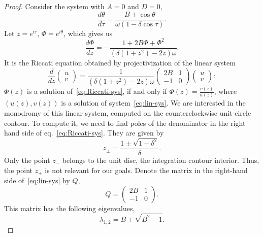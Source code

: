 \documentclass[preprint,12pt]{elsarticle}
\theoremstyle{plain}
\numberwithin{equation}{section}
\numberwithin{equation}{section}
\begin{document}
\begin{proof}

Consider the system with $A=0$ and $D=0$,
\begin{equation}\label{eq:zero-AD-tor-sys}
    \frac{d\theta}{d\tau} = \frac{B+\cos\theta}{\omega(1-\delta\cos\tau)}.
\end{equation}
Let $z=e^{i\tau}$, $\Phi=e^{i\theta}$, which gives us
\begin{equation}\label{eq:Riccati-sys}
    \frac{d\Phi}{dz}=-\frac{1+2B\Phi+\Phi^2}{(\delta(1+z^2)-2z)\omega}.
\end{equation}
It is the Riccati equation obtained by  projectivization of the linear system 
\begin{equation}\label{eq:lin-sys}
    \frac{d}{dz}
    \begin{pmatrix}
        u \\ v
    \end{pmatrix}=
    \frac{1}{(\delta(1+z^2)-2z)\omega}
    \begin{pmatrix}
        2B & 1 \\ -1 & 0
    \end{pmatrix}
    \begin{pmatrix}
        u \\ v
    \end{pmatrix}:
\end{equation}
$\Phi(z)$ is a solution of~\eqref{eq:Riccati-sys}, if and only if $\Phi(z)=\frac{v(z)}{u(z)}$, where $(u(z),v(z))$ is a solution of system~\eqref{eq:lin-sys}. 
We are interested in the monodromy of this linear system, computed on the counterclockwise unit circle contour. To compute it, we need to find poles of the denominator in the right hand side of eq.~\eqref{eq:Riccati-sys}. They are given by
\begin{equation}
    z_{\pm} = \frac{1\pm\sqrt{1-\delta^2}}{\delta}.
\end{equation}
Only the point $z_{-}$ belongs to the unit disc, the integration contour interior. Thus, the point $z_+$ is not relevant for our goals. Denote the matrix in the right-hand side of~\eqref{eq:lin-sys} by $Q$,
\begin{equation}
    Q=
    \begin{pmatrix}
        2B & 1 \\ -1 & 0
    \end{pmatrix}.
\end{equation}
This matrix has the following eigenvalues,
\begin{equation}
    \lambda_{1,2}=B\mp\sqrt{B^2-1}.

\end{equation}
\end{proof}
\end{document}
